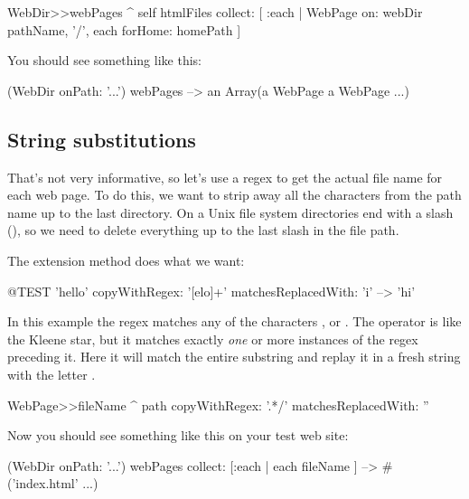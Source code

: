 \documentclass[a4paper,10pt,twoside]{book}
\begin{document}
\begin{code}{}
WebDir>>webPages
	^ self htmlFiles collect: 
		[ :each | WebPage 
			on: webDir pathName, '/', each
			forHome: homePath ]
\end{code}

You should see something like this:

\begin{code}{}
(WebDir onPath: '...') webPages --> an Array(a WebPage a WebPage ...)
\end{code}

\subsection{String substitutions}

That's not very informative, so let's use a regex to get the actual file name for each web page.
To do this, we want to strip away all the characters from the path name up to the last directory.
On a Unix file system directories end with a slash (\ct{/}), so we need to delete everything up to the last slash in the file path.

The  extension method  does what we want:

\begin{code}{@TEST}
'hello' copyWithRegex: '[elo]+' matchesReplacedWith: 'i' --> 'hi'
\end{code}

In this example the regex \ct{[elo]} matches any of the characters ,  or .
The operator \ct{+} is like the Kleene star, but it matches exactly \emph{one} or more instances of the regex preceding it. Here it will match the entire substring  and replay it in a fresh string with the letter .


\begin{code}{}
WebPage>>fileName
	^ path copyWithRegex: '.*/' matchesReplacedWith: ''
\end{code}

Now you should see something like this on your test web site:

\begin{code}{}
(WebDir onPath: '...') webPages collect: [:each | each fileName ]
  --> #('index.html' ...)
\end{code}
\end{document}
